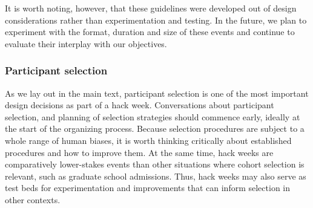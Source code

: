 \documentclass{aastex62}
\begin{document}
It is worth noting, however, that these guidelines were developed out of design considerations rather than experimentation and testing. In the future, we plan to experiment with the format, duration and size of these events and continue to evaluate their interplay with our objectives.

\subsubsection{Participant selection}

As we lay out in the main text, participant selection is one of the most important design decisions as part of a hack week. Conversations about participant selection, and planning of selection strategies should commence early, ideally at the start of the organizing process.
Because selection procedures are subject to a whole range of human biases, it is worth thinking critically about established procedures and how to improve them. At the same time, hack weeks are comparatively lower-stakes events than other situations where cohort selection is relevant, such as graduate school admissions. Thus, hack weeks may also serve as test beds for experimentation and improvements that can inform selection in other contexts.
\end{document}

